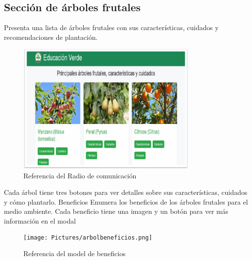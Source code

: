 \documentclass[11pt, a4paper, oneside]{book}
\begin{document}
\subsection {Sección de árboles frutales}
Presenta una lista de árboles frutales con sus características, cuidados y recomendaciones de plantación.
\begin{figure}[H]
\centering
\includegraphics[width=0.8\textwidth]{Pictures/arboles.png}
\caption{Referencia del Radio de comunicación}
\end{figure}

Cada árbol tiene tres botones para ver detalles sobre sus características, cuidados y cómo plantarlo.
Beneficios
Enumera los beneficios de los árboles frutales para el medio ambiente.
Cada beneficio tiene una imagen y un botón para ver más información en el modal
\begin{figure}[H]
\centering
\texttt{[image: Pictures/arbolbeneficios.png]}
\caption{Referencia del model de beneficios}
\end{figure}
\end{document}
